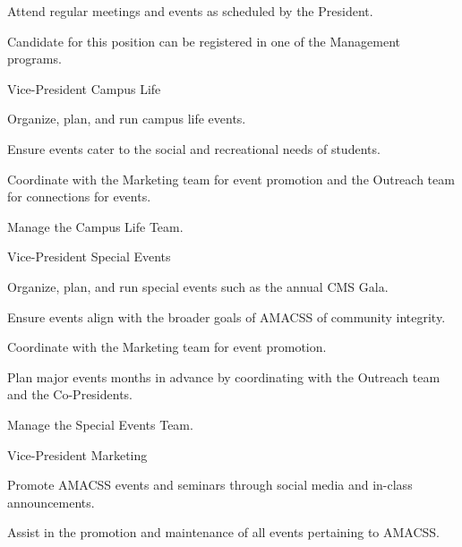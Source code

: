 \documentclass[12pt,a4paper]{article}
\begin{document}
\begin{constitutionlist}
\begin{constitutionlist}
\begin{constitutionlist}
\item Attend regular meetings and events as scheduled by the President.

\item Candidate for this position can be registered in one of the Management programs.
\end{constitutionlist}

\item Vice-President Campus Life

\begin{constitutionlist}
\item Organize, plan, and run campus life events.

\item Ensure events cater to the social and recreational needs of students.

\item Coordinate with the Marketing team for event promotion and the Outreach team for connections for events.

\item Manage the Campus Life Team.
\end{constitutionlist}

\item Vice-President Special Events

\begin{constitutionlist}
\item Organize, plan, and run special events such as the annual CMS Gala. 

\item Ensure events align with the broader goals of AMACSS of community integrity.

\item Coordinate with the Marketing team for event promotion.

\item Plan major events months in advance by coordinating with the Outreach team and the Co-Presidents.

\item Manage the Special Events Team.
\end{constitutionlist}

\item Vice-President Marketing

\begin{constitutionlist}
\item Promote AMACSS events and seminars through social media and in-class announcements.

\item Assist in the promotion and maintenance of all events pertaining to AMACSS.


\end{constitutionlist}
\end{constitutionlist}
\end{constitutionlist}
\end{document}
